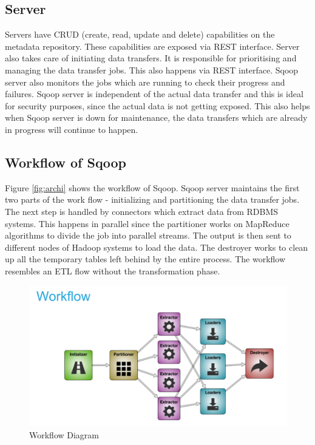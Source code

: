 \documentclass[9pt,twocolumn,twoside]{styles/osajnl}
\begin{document}
\subsection{Server}
Servers have CRUD (create, read, update and delete) capabilities on the metadata repository. These capabilities are exposed via REST interface. Server also takes care of initiating data transfers. It is responsible for prioritising and managing the data transfer jobs. This also happens via REST interface. Sqoop server also monitors the jobs which are running to check their progress and failures. Sqoop server is independent of the actual data transfer and this is ideal for security purposes, since the actual data is not getting exposed. This also helps when Sqoop server is down for maintenance, the data transfers which are already in progress will continue to happen. \subsection{Workflow of Sqoop}
Figure \ref{fig:archi} shows the workflow of Sqoop. Sqoop server maintains the first two parts of the work flow -  initializing and partitioning the data transfer jobs. The next step is handled by connectors which extract data from RDBMS systems. This happens in parallel since the partitioner works on MapReduce algorithms to divide the job into parallel streams. The output is then sent to different nodes of Hadoop systems to load the data. The destroyer works to clean up all the temporary tables left behind by the entire process. The workflow resembles an ETL flow without the transformation phase.

\begin{figure}[htbp]
\centering
\includegraphics[width=\linewidth]{images/work.png}
\caption{Workflow Diagram}
\label{fig:work}
\end{figure}
\end{document}
